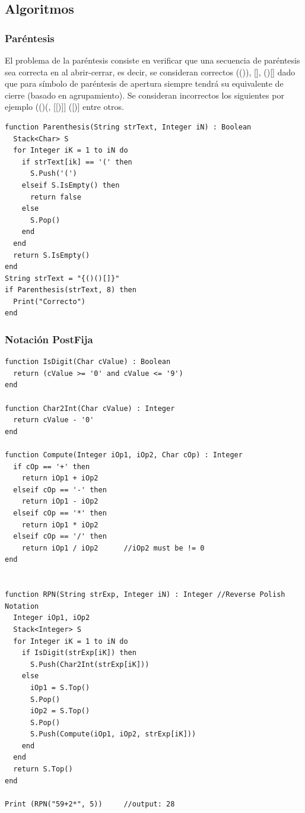 \subsection{Algoritmos}

\subsubsection{Paréntesis}

El problema de la paréntesis consiste en verificar que una secuencia de paréntesis sea correcta en al abrir-cerrar, es decir, se consideran correctos (()), [{}], {()[]} dado que para símbolo de paréntesis de apertura siempre tendrá su equivalente de cierre (basado en agrupamiento). Se consideran incorrectos los siguientes por ejemplo (()(, [[)]] ([)] entre otros.

\begin{lstlisting}[upquote=true, language=pseudo]
function Parenthesis(String strText, Integer iN) : Boolean
  Stack<Char> S
  for Integer iK = 1 to iN do
    if strText[ik] == '(' then
      S.Push('(')
    elseif S.IsEmpty() then
      return false
    else
      S.Pop()
    end
  end
  return S.IsEmpty()
end
String strText = "{()()[]}"
if Parenthesis(strText, 8) then
  Print("Correcto")
end
\end{lstlisting}

\subsubsection{Notación PostFija}


\begin{lstlisting}[upquote=true, language=pseudo]
function IsDigit(Char cValue) : Boolean
  return (cValue >= '0' and cValue <= '9')
end

function Char2Int(Char cValue) : Integer
  return cValue - '0'
end

function Compute(Integer iOp1, iOp2, Char cOp) : Integer
  if cOp == '+' then
    return iOp1 + iOp2
  elseif cOp == '-' then
    return iOp1 - iOp2
  elseif cOp == '*' then
    return iOp1 * iOp2
  elseif cOp == '/' then
    return iOp1 / iOp2		//iOp2 must be != 0
end


function RPN(String strExp, Integer iN) : Integer //Reverse Polish Notation
  Integer iOp1, iOp2
  Stack<Integer> S
  for Integer iK = 1 to iN do
    if IsDigit(strExp[iK]) then
      S.Push(Char2Int(strExp[iK]))
    else
      iOp1 = S.Top()
      S.Pop()
      iOp2 = S.Top()
      S.Pop()
      S.Push(Compute(iOp1, iOp2, strExp[iK]))
    end
  end
  return S.Top()
end

Print (RPN("59+2*", 5))		//output: 28
\end{lstlisting}


